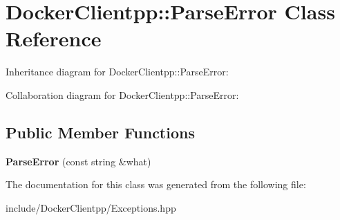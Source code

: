 \hypertarget{classDockerClientpp_1_1ParseError}{}\section{Docker\+Clientpp\+::Parse\+Error Class Reference}
\label{classDockerClientpp_1_1ParseError}


Inheritance diagram for Docker\+Clientpp\+::Parse\+Error\+:


Collaboration diagram for Docker\+Clientpp\+::Parse\+Error\+:
\subsection*{Public Member Functions}
\begin{DoxyCompactItemize}
\item 
\mbox{\label{classDockerClientpp_1_1ParseError_ac6288f3ddcf7f5b0db0e87e659a36126}} 
{\bfseries Parse\+Error} (const string \&what)
\end{DoxyCompactItemize}


The documentation for this class was generated from the following file\+:\begin{DoxyCompactItemize}
\item 
include/\+Docker\+Clientpp/Exceptions.\+hpp\end{DoxyCompactItemize}
